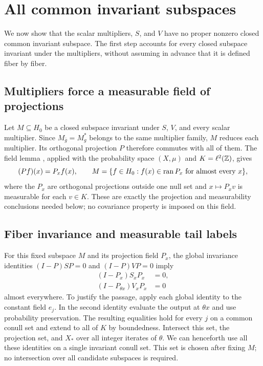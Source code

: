 \section{All common invariant subspaces}\label{sec:subspaces}
We now show that the scalar multipliers, $S$, and $V$ have no proper nonzero closed common invariant subspace. The first step accounts for every closed subspace invariant under the multipliers, without assuming in advance that it is defined fiber by fiber.

\subsection{Multipliers force a measurable field of projections}
Let $M\subseteq H_0$ be a closed subspace invariant under $S$, $V$,
and every scalar multiplier. Since $M_{\bar g}=M_g^*$ belongs to the
same multiplier family, $M$ reduces each multiplier. Its orthogonal
projection $P$ therefore commutes with all of them. The field lemma
\cite[\FieldImportLocator]{CircleCompanion}, applied with the probability
space $(X,\mu)$ and $K=\ell^2(\mathbb Z)$, gives
\[
 (Pf)(x)=P_xf(x),\qquad
 M=\{f\in H_0:f(x)\in\operatorname{ran} P_x\text{ for almost every }x\},
\]
where the $P_x$ are orthogonal projections outside one null set and
$x\mapsto P_xv$ is measurable for each $v\in K$. These are exactly the
projection and measurability conclusions needed below; no covariance
property is imposed on this field.

\subsection{Fiber invariance and measurable tail labels}
For this fixed subspace $M$ and its projection field $P_x$, the global invariance identities $(I-P)SP=0$ and $(I-P)VP=0$ imply
\begin{align}
 (I-P_x)S_xP_x&=0,\label{eq:fiber-S}\\
 (I-P_{\theta x})V_xP_x&=0\label{eq:fiber-V}
\end{align}
almost everywhere. To justify the passage, apply each global identity to the constant field $e_j$. In the second identity evaluate the output at $\theta x$ and use probability preservation. The resulting equalities hold for every $j$ on a common conull set and extend to all of $K$ by boundedness. Intersect this set, the projection set, and $X_*$ over all integer iterates of $\theta$. We can henceforth use all these identities on a single invariant conull set. This set is chosen after fixing $M$; no intersection over all candidate subspaces is required.

